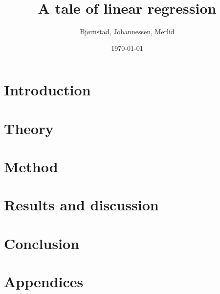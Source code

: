 \documentclass[aps,rmp,reprint,amsmath,amssymb,twocolumn,floatfix]{revtex4-1}
\begin{document}
\title{A tale of linear regression}

\author{Bjørnstad, Johannessen, Merlid}
\date{\today}


\begin{abstract}

\end{abstract}
\maketitle

\tableofcontents

\section{Introduction}
\label{sec:introduction}

\section{Theory}


\section{Method}


\section{Results and discussion}


%

\section{Conclusion}


\newpage
{} %

\appendix
\section{Appendices}
\label{appendix}

\end{document}
